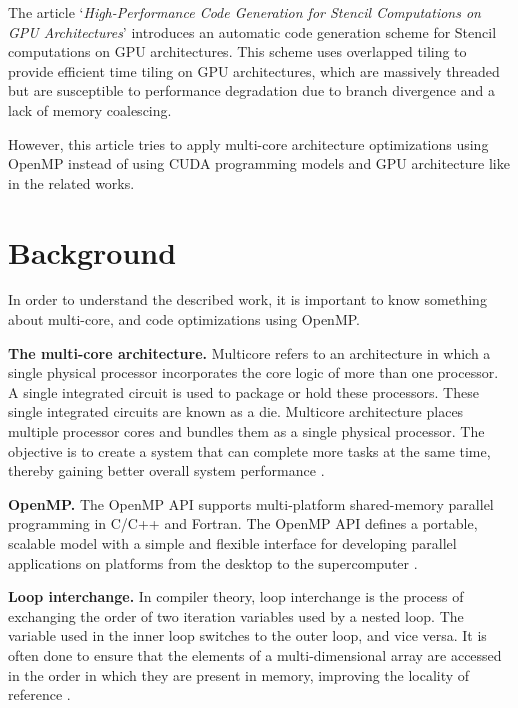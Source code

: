 \documentclass[conference]{IEEEtran}
\newcommand{\mypar}[1]{{\bf #1.}}
\begin{document}
The article `\textit{High-Performance Code Generation for Stencil Computations on GPU Architectures}' \cite{holewinski-pouchet-sadayappan} introduces an automatic code generation scheme for Stencil computations on GPU architectures. This scheme uses overlapped tiling to provide efficient time tiling on GPU architectures, which are massively threaded but are susceptible to performance degradation due to branch divergence and a lack of memory coalescing. 

However, this article tries to apply multi-core architecture optimizations using OpenMP instead of using CUDA programming models and GPU architecture like in the related works.

\section{Background}\label{sec:background}

In order to understand the described work, it is important to know something about multi-core, and code optimizations using OpenMP.

\mypar{The multi-core architecture}
Multicore refers to an architecture in which a single physical processor incorporates the core logic of more than one processor. A single integrated circuit is used to package or hold these processors. These single integrated circuits are known as a die. Multicore architecture places multiple processor cores and bundles them as a single physical processor. The objective is to create a system that can complete more tasks at the same time, thereby gaining better overall system performance \cite{techopedia}.

\mypar{OpenMP}
The OpenMP API supports multi-platform shared-memory parallel programming in C/C++ and Fortran. The OpenMP API defines a portable, scalable model with a simple and flexible interface for developing parallel applications on platforms from the desktop to the supercomputer \cite{openmp}.

\mypar{Loop interchange}
In compiler theory, loop interchange is the process of exchanging the order of two iteration variables used by a nested loop. The variable used in the inner loop switches to the outer loop, and vice versa. It is often done to ensure that the elements of a multi-dimensional array are accessed in the order in which they are present in memory, improving the locality of reference \cite{loop-interchange}.
\end{document}
